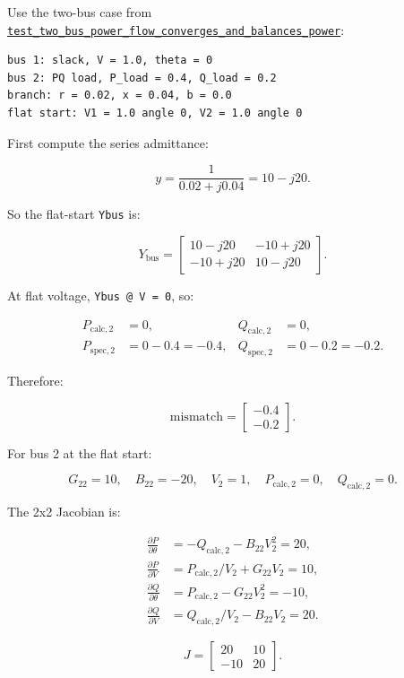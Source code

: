 \documentclass[11pt]{article}
\newcommand{\code}[1]{\texttt{#1}}
\begin{document}
Use the two-bus case from
\href{../tests/test_solver.py\#L38}{\code{test\_two\_bus\_power\_flow\_converges\_and\_balances\_power}}:

\begin{verbatim}
bus 1: slack, V = 1.0, theta = 0
bus 2: PQ load, P_load = 0.4, Q_load = 0.2
branch: r = 0.02, x = 0.04, b = 0.0
flat start: V1 = 1.0 angle 0, V2 = 1.0 angle 0
\end{verbatim}

First compute the series admittance:

\[
y = \frac{1}{0.02 + j0.04} = 10 - j20.
\]

So the flat-start \code{Ybus} is:

\[
Y_{\mathrm{bus}} =
\begin{bmatrix}
10 - j20 & -10 + j20 \\
-10 + j20 & 10 - j20
\end{bmatrix}.
\]

At flat voltage, \code{Ybus @ V = 0}, so:

\begin{align*}
P_{\mathrm{calc},2} &= 0, &
Q_{\mathrm{calc},2} &= 0, \\
P_{\mathrm{spec},2} &= 0 - 0.4 = -0.4, &
Q_{\mathrm{spec},2} &= 0 - 0.2 = -0.2.
\end{align*}

Therefore:

\[
\mathrm{mismatch} =
\begin{bmatrix}
-0.4 \\
-0.2
\end{bmatrix}.
\]

For bus 2 at the flat start:

\[
G_{22} = 10,\quad B_{22} = -20,\quad V_2 = 1,\quad
P_{\mathrm{calc},2} = 0,\quad Q_{\mathrm{calc},2} = 0.
\]

The 2x2 Jacobian is:

\begin{align*}
\frac{\partial P}{\partial \theta}
  &= -Q_{\mathrm{calc},2} - B_{22} V_2^2 = 20, \\
\frac{\partial P}{\partial V}
  &= P_{\mathrm{calc},2} / V_2 + G_{22} V_2 = 10, \\
\frac{\partial Q}{\partial \theta}
  &= P_{\mathrm{calc},2} - G_{22} V_2^2 = -10, \\
\frac{\partial Q}{\partial V}
  &= Q_{\mathrm{calc},2} / V_2 - B_{22} V_2 = 20.
\end{align*}

\[
J =
\begin{bmatrix}
20 & 10 \\
-10 & 20
\end{bmatrix}.
\]
\end{document}
